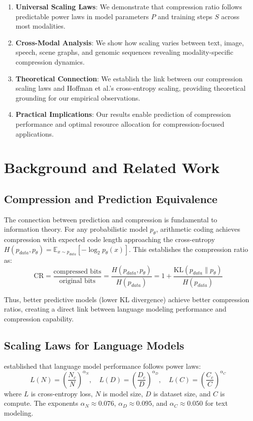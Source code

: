 \documentclass[10pt]{article} %
\begin{document}
\begin{enumerate}
\item \textbf{Universal Scaling Laws}: We demonstrate that compression ratio follows predictable power laws in model parameters $P$ and training steps $S$ across most modalities.
\item \textbf{Cross-Modal Analysis}: We show how scaling varies between text, image, speech, scene graphs, and genomic sequences revealing modality-specific compression dynamics.
\item \textbf{Theoretical Connection}: We establish the link between our compression scaling laws and Hoffman et al.'s cross-entropy scaling, providing theoretical grounding for our empirical observations.

\item \textbf{Practical Implications}: Our results enable prediction of compression performance and optimal resource allocation for compression-focused applications.
\end{enumerate}

\section{Background and Related Work}
\subsection{Compression and Prediction Equivalence}

The connection between prediction and compression is fundamental to information theory. For any probabilistic model $p_\theta$, arithmetic coding achieves compression with expected code length approaching the cross-entropy $H(p_{data}, p_\theta) = \mathbb{E}_{x \sim p_{data}}[-\log_2 p_\theta(x)]$. This establishes the compression ratio as:
\[
\mathrm{CR} = \frac{\text{compressed bits}}{\text{original bits}} = \frac{H(p_{data}, p_\theta)}{H(p_{data})} = 1 + \frac{\mathrm{KL}(p_{data} \parallel p_\theta)}{H(p_{data})}
\]

Thus, better predictive models (lower KL divergence) achieve better compression ratios, creating a direct link between language modeling performance and compression capability.

\subsection{Scaling Laws for Language Models}

\citet{kaplan2020scaling} established that language model performance follows power laws:
\[
L(N) = \left(\frac{N_c}{N}\right)^{\alpha_N}, \quad L(D) = \left(\frac{D_c}{D}\right)^{\alpha_D}, \quad L(C) = \left(\frac{C_c}{C}\right)^{\alpha_C}
\]
where $L$ is cross-entropy loss, $N$ is model size, $D$ is dataset size, and $C$ is compute. The exponents $\alpha_N \approx 0.076$, $\alpha_D \approx 0.095$, and $\alpha_C \approx 0.050$ for text modeling.
\end{document}
